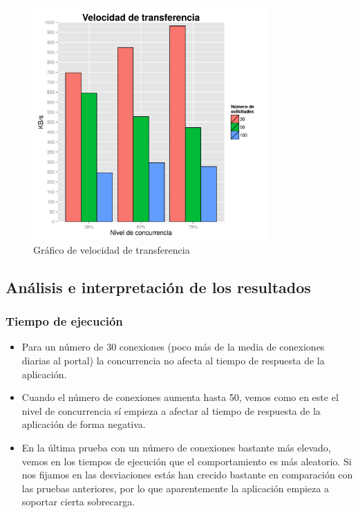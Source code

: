 \begin{figure}[!ht]
	\begin{center}
		\includegraphics[width=0.8\textwidth]{../graphics/gra_vt.png}
		\caption{Gráfico de velocidad de transferencia}
		\label{fig:gra_vt}
	\end{center}
\end{figure}

\newpage
\subsection{Análisis e interpretación de los resultados}

\subsubsection{Tiempo de ejecución}
\begin{itemize}
	\item Para un número de 30 conexiones (poco más de la media de conexiones diarias al portal) la concurrencia no afecta al tiempo de respuesta de la aplicación.
	\item Cuando el número de conexiones aumenta hasta 50, vemos como en este el nivel de concurrencia sí empieza a afectar al tiempo de respuesta de la aplicación de forma negativa.
	\item En la última prueba con un número de conexiones bastante más elevado, vemos en los tiempos de ejecución que el comportamiento es más aleatorio. Si nos fijamos en las desviaciones estás han crecido bastante en comparación con las pruebas anteriores, por lo que aparentemente la aplicación empieza a soportar cierta sobrecarga.
\end{itemize}

